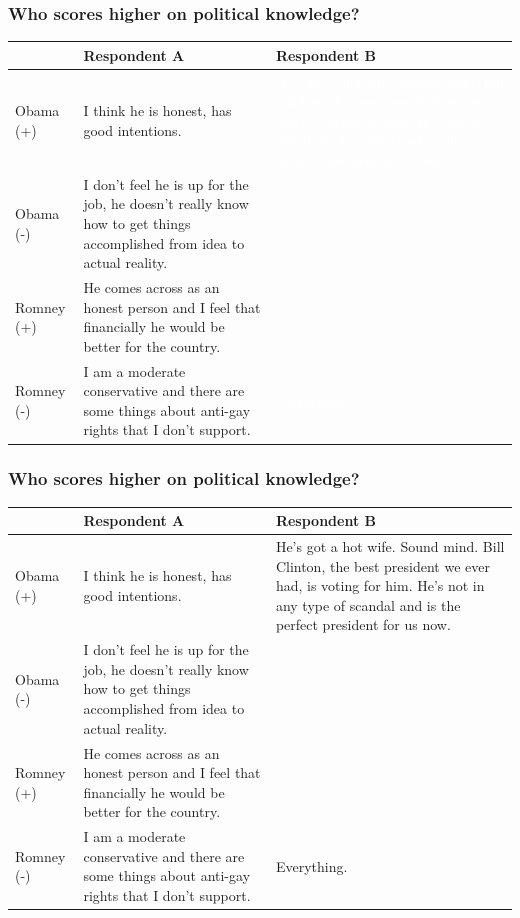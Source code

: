 \documentclass{beamer}
\begin{document}
\begin{frame}%
\frametitle{Who scores higher on political knowledge?}
\begin{table}[ht]\footnotesize\centering
\begin{tabular}{l|p{4.5cm}|p{4.5cm}}
   \toprule
    & \textbf{Respondent A} & \textbf{Respondent B} \\ 
    \midrule
  Obama (+) & I think he is honest, has good intentions. & \textcolor{white}{He's got a hot wife. Sound mind. Bill Clinton, the best president we ever had, is voting for him. He's not in any type of scandal and is the perfect president for us now.} \\ \hdashline
  Obama (-) & I don't feel he is up for the job, he doesn't really know how to get things accomplished from idea to actual reality. &  \\ \hdashline
  Romney (+) & He comes across as an honest person and I feel that financially he would be better for the country. &  \\ \hdashline
  Romney (-) & I am a moderate conservative and there are some things about anti-gay rights that I don't support. & \textcolor{white}{Everything.} \\
    \bottomrule
 \end{tabular}
\end{table}
\end{frame}


\begin{frame}%
\frametitle{Who scores higher on political knowledge?}
\begin{table}[ht]\footnotesize\centering
\begin{tabular}{l|p{4.5cm}|p{4.5cm}}
   \toprule
    & \textbf{Respondent A} & \textbf{Respondent B} \\ 
    \midrule
  Obama (+) & I think he is honest, has good intentions. & He's got a hot wife. Sound mind. Bill Clinton, the best president we ever had, is voting for him. He's not in any type of scandal and is the perfect president for us now. \\ \hdashline
  Obama (-) & I don't feel he is up for the job, he doesn't really know how to get things accomplished from idea to actual reality. &  \\ \hdashline
  Romney (+) & He comes across as an honest person and I feel that financially he would be better for the country. &  \\ \hdashline
  Romney (-) & I am a moderate conservative and there are some things about anti-gay rights that I don't support. & Everything. \\
    \bottomrule
 \end{tabular}
\end{table}
\end{frame}
\end{document}
